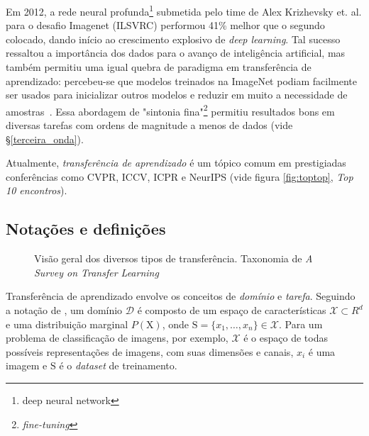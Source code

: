 \documentclass[sigconf]{acmart}
\begin{document}
  Em 2012, a rede neural profunda\footnote{deep neural network} submetida pelo time de Alex Krizhevsky et. al. para o desafio Imagenet (ILSVRC) performou 41\% melhor que o segundo colocado, dando início ao crescimento explosivo de \emph{deep learning}. Tal sucesso ressaltou a importância dos dados para o avanço de inteligência artificial, mas também permitiu uma igual quebra de paradigma em transferência de aprendizado: percebeu-se que modelos treinados na ImageNet podiam facilmente ser usados para inicializar outros modelos e reduzir em muito a necessidade de amostras~\cite{Ruder2019Neural}.   Essa abordagem de "sintonia fina"\footnote{\emph{fine-tuning}} permitiu resultados bons em diversas tarefas com ordens de magnitude a menos de dados (vide \S\ref{terceira_onda}). 

  Atualmente, \emph{transferência de aprendizado} é um tópico comum em prestigiadas conferências como CVPR, ICCV, ICPR e NeurIPS (vide figura \ref{fig:toptop}, \emph{Top 10 encontros}).
  \subsection{Notações e definições}
  \begin{figure}[h]
    \caption{Visão geral dos diversos tipos de transferência. Taxonomia de \emph{A Survey on Transfer Learning} }
    \label{fig:taxonomia}
  \end{figure}
    Transferência de aprendizado envolve os conceitos de \emph{domínio} e \emph{tarefa}. Seguindo a notação de \cite{PanYang}, um domínio $\mathcal{D}$ é composto de um espaço de características $\mathcal{X}\subset R^d$ e uma distribuição marginal $P(\mathrm{X})$, onde $\mathrm{S}=\{x_1, \dots, x_n\}\in\mathcal{X} $. Para um problema de classificação de imagens, por exemplo, $\mathcal{X}$ é o espaço de todas possíveis representações de imagens, com suas dimensões e canais, $x_i$ é uma imagem e $\mathrm{S}$ é o \textit{dataset} de treinamento. 
\end{document}
